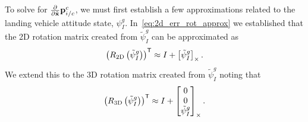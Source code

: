 To solve for $\frac{\partial}{\partial \tilde{\mathrm{\mathbf{x}}}} \mathrm{\mathbf{p}}_{i/c}^c$, we must
first establish a few approximations related to the landing vehicle attitude
state, $\psi_I^g$. In~\eqref{eq:2d_err_rot_approx} we established that the 2D
rotation matrix created from $\tilde{\psi}_I^g$ can be approximated as
\begin{equation}
  \left( R_{\text{2D}} \left( \tilde{\psi}_I^g \right) \right)^{\mathsf{T}}
  \approx I +
  \left[ \tilde{\psi}_I^g \right]_{\times}.
\end{equation}
We extend this to the 3D rotation matrix created from $\tilde{\psi}_I^g$ noting
that
\begin{equation}
  \left( R_{\text{3D}} \left( \tilde{\psi}_I^g \right) \right)^{\mathsf{T}}
  \approx I +
  \left[ 
    \begin{matrix}
  0 \\ 0 \\ \tilde{\psi}_I^g  \end{matrix}
   \right]_{\times}.
  \label{eq:3d_psi_rot_approx}
\end{equation}

